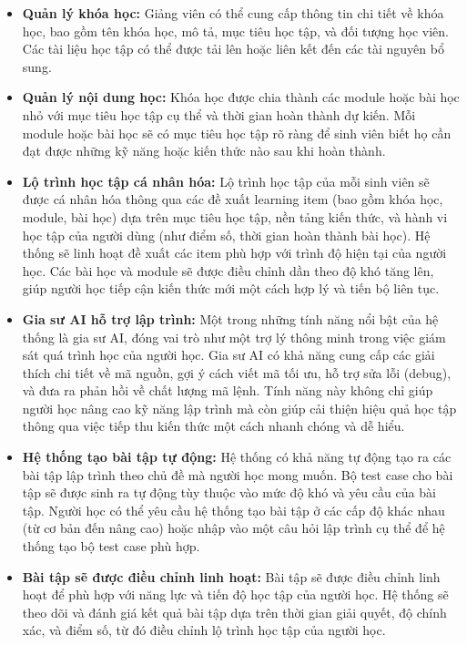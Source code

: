 \begin{itemize}
    \item \textbf{Quản lý khóa học:} Giảng viên có thể cung cấp thông tin chi tiết về khóa học, bao gồm tên khóa học, mô tả, mục tiêu học tập, và đối tượng học viên. Các tài liệu học tập có thể được tải lên hoặc liên kết đến các tài nguyên bổ sung.
    
    \item \textbf{Quản lý nội dung học:} Khóa học được chia thành các module hoặc bài học nhỏ với mục tiêu học tập cụ thể và thời gian hoàn thành dự kiến. Mỗi module hoặc bài học sẽ có mục tiêu học tập rõ ràng để sinh viên biết họ cần đạt được những kỹ năng hoặc kiến thức nào sau khi hoàn thành.
    
    \item \textbf{Lộ trình học tập cá nhân hóa:} Lộ trình học tập của mỗi sinh viên sẽ được cá nhân hóa thông qua các đề xuất learning item (bao gồm khóa học, module, bài học) dựa trên mục tiêu học tập, nền tảng kiến thức, và hành vi học tập của người dùng (như điểm số, thời gian hoàn thành bài học). Hệ thống sẽ linh hoạt đề xuất các item phù hợp với trình độ hiện tại của người học. Các bài học và module sẽ được điều chỉnh dần theo độ khó tăng lên, giúp người học tiếp cận kiến thức mới một cách hợp lý và tiến bộ liên tục.
    
    \item \textbf{Gia sư AI hỗ trợ lập trình:} Một trong những tính năng nổi bật của hệ thống là gia sư AI, đóng vai trò như một trợ lý thông minh trong việc giám sát quá trình học của người học. Gia sư AI có khả năng cung cấp các giải thích chi tiết về mã nguồn, gợi ý cách viết mã tối ưu, hỗ trợ sửa lỗi (debug), và đưa ra phản hồi về chất lượng mã lệnh. Tính năng này không chỉ giúp người học nâng cao kỹ năng lập trình mà còn giúp cải thiện hiệu quả học tập thông qua việc tiếp thu kiến thức một cách nhanh chóng và dễ hiểu.
    
    \item \textbf{Hệ thống tạo bài tập tự động:} Hệ thống có khả năng tự động tạo ra các bài tập lập trình theo chủ đề mà người học mong muốn. Bộ test case cho bài tập sẽ được sinh ra tự động tùy thuộc vào mức độ khó và yêu cầu của bài tập. Người học có thể yêu cầu hệ thống tạo bài tập ở các cấp độ khác nhau (từ cơ bản đến nâng cao) hoặc nhập vào một câu hỏi lập trình cụ thể để hệ thống tạo bộ test case phù hợp.
    
    \item \textbf{Bài tập sẽ được điều chỉnh linh hoạt:} Bài tập sẽ được điều chỉnh linh hoạt để phù hợp với năng lực và tiến độ học tập của người học. Hệ thống sẽ theo dõi và đánh giá kết quả bài tập dựa trên thời gian giải quyết, độ chính xác, và điểm số, từ đó điều chỉnh lộ trình học tập của người học.
    

\end{itemize}

